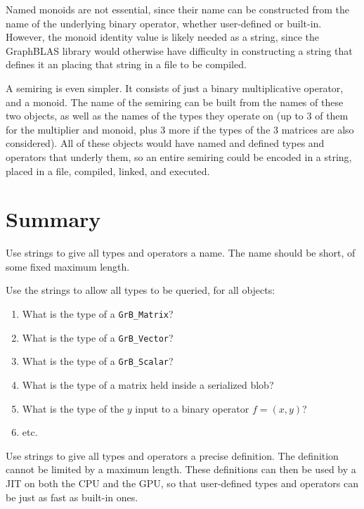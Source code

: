 \documentclass[12pt]{article}
\begin{document}
Named monoids are not essential, since their name can be constructed from
the name of the underlying binary operator, whether user-defined or built-in.
However, the monoid identity value is likely needed as a string, since the
GraphBLAS library would otherwise have difficulty in constructing a string
that defines it an placing that string in a file to be compiled.

A semiring is even simpler.  It consists of just a binary multiplicative
operator, and a monoid.  The name of the semiring can be built from the
names of these two objects, as well as the names of the types they operate
on (up to 3 of them for the multiplier and monoid, plus 3 more if the types
of the 3 matrices are also considered).  All of these objects would have
named and defined types and operators that underly them, so an entire
semiring could be encoded in a string, placed in a file, compiled, linked,
and executed.

\section{Summary}

Use strings to give all types and operators a name.  The name should be
short, of some fixed maximum length.

Use the strings to allow all types to be queried, for all objects:

    \begin{enumerate}
    \item What is the type of a \verb'GrB_Matrix'?
    \item What is the type of a \verb'GrB_Vector'?
    \item What is the type of a \verb'GrB_Scalar'?
    \item What is the type of a matrix held inside a serialized blob?
    \item What is the type of the $y$ input to a binary operator $f=(x,y)$?
    \item etc.
    \end{enumerate}

Use strings to give all types and operators a precise definition.  The
definition cannot be limited by a maximum length.   These definitions can then
be used by a JIT on both the CPU and the GPU, so that user-defined types
and operators can be just as fast as built-in ones.
\end{document}
